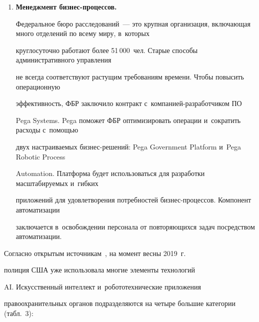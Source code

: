 \begin{enumerate}[1.]
них~--- Javelin, которая следит за внут\-рен\-ни\-ми проступками, нарушениями безопасности


и~внутренним шпионажем. Другая~--- это платформа анализа внутренних угроз (InTAP), которая


просматривает большие объемы данных, чтобы найти шаблоны, ука\-зы\-ва\-ющие на


подозрительные действия и~потенциальные угрозы для организации. Обе эти программы


находятся в~стадии реализации.


\item %


\textbf{Менеджмент бизнес-процессов.}


Федеральное бюро расследований~--- это крупная организация, включающая много отделений по всему миру, в~которых


круглосуточно работают более 51\,000~чел. Старые способы административного управ\-ле\-ния


не всегда соответствуют растущим требованиям времени. Чтобы повысить операционную


эффективность, ФБР заключило контракт с~ком\-па\-ни\-ей-раз\-ра\-бот\-чи\-ком ПО


Pega Systems. Pega поможет ФБР оптимизировать операции и~сократить расходы с~по\-мощью


двух настраиваемых биз\-нес-ре\-ше\-ний: Pega Government Platform и~Pega Robotic Process


Automation. Платформа будет использоваться для разработки масштабируемых и~гибких


приложений для удовлетворения потребностей биз\-нес-про\-цес\-сов. Компонент автоматизации


заключается в~освобождении персонала от повторяющихся задач посредством автоматизации.


  \end{enumerate}








  Согласно открытым источникам~\cite{17-bor}, на момент весны 2019~г.\


{полиция США} уже использовала многие элементы технологий


AI. Искусственный интеллект и~робототехнические приложения


правоохранительных органов подразделяются на четыре большие категории (табл.~3):


